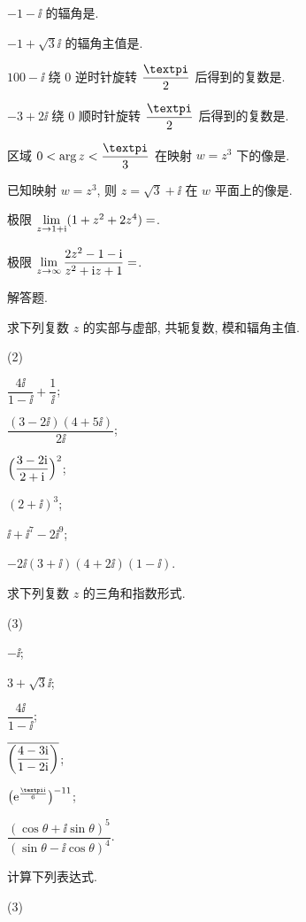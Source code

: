 \begin{homework}
\begin{homework}
    \item $-1-\ii$ 的辐角是\fillblank{}.
    \item $-1+\sqrt 3\ii$ 的辐角主值是\fillblank{}.
    \item $100-\ii$ 绕 $0$ 逆时针旋转 $\dfrac\cpi2$ 后得到的复数是\fillblank{}.
    \item $-3+2\ii$ 绕 $0$ 顺时针旋转 $\dfrac\cpi2$ 后得到的复数是\fillblank{}.
    \item 区域 $0<\arg z<\dfrac\cpi3$ 在映射 $w=z^3$ 下的像是\fillblank[12em]{}.
    \item 已知映射 $w=z^3$, 则 $z=\sqrt3+\ii$ 在 $w$ 平面上的像是\fillblank{}.
    \item 极限 $\lim\limits_{z\rightarrow 1+\mathrm{i}}(1+z^2+2z^4)=$\fillblank{}.
    \item 极限 $\lim\limits_{z\rightarrow\infty}\dfrac{2z^2-1-\mathrm{i}}{z^2+\mathrm{i} z+1}=$\fillblank{}.
  \end{homework}
  \item 解答题.
  \begin{homework}
    \item 求下列复数 $z$ 的实部与虚部, 共轭复数, 模和辐角主值.
    \begin{subhomework}[after-item-skip=2pt](2)
      \item $\dfrac{4\ii}{1-\ii}+\dfrac1\ii$;
      \item $\dfrac{(3-2\ii)(4+5\ii)}{2\ii}$;
      \item $\Bigl(\dfrac{3-2\mathrm{i}}{2+\mathrm{i}}\Bigr)^2$;
      \item $(2+\ii)^3$;
      \item $\ii+\ii^7-2\ii^9$;
      \item $-2\ii(3+\ii)(4+2\ii)(1-\ii)$.
    \end{subhomework}
    \item 求下列复数 $z$ 的三角和指数形式.
    \begin{subhomework}(3)
      \item $-\ii$;
      \item $3+\sqrt 3\ii$;
      \item $\dfrac{4\ii}{1-\ii}$;
      \item $\overline{\biggl(\dfrac{4-3\mathrm{i}}{1-2\mathrm{i}}\biggr)}$;
      \item $\bigl(\ee^{\frac{\cpi\ii}6}\bigr)^{-11}$;
      \item $\dfrac{(\cos \theta+\ii\sin \theta)^5}{(\sin \theta-\ii\cos \theta)^4}$.
    \end{subhomework}
    \item 计算下列表达式.
    \begin{subhomework}(3)

\end{subhomework}
\end{homework}
\end{homework}
